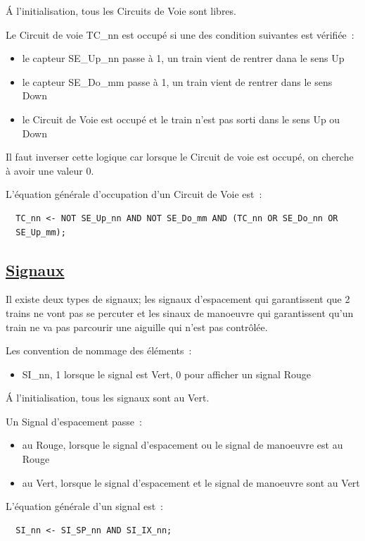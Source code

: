 \'A l'initialisation, tous les Circuits de Voie sont libres.

\medskip
Le Circuit de voie TC\_nn est occupé si une des condition suivantes
est vérifiée~:
\begin{itemize}
\item le capteur SE\_Up\_nn passe à 1, un train vient de rentrer dana
  le sens Up
\item le capteur SE\_Do\_mm passe à 1, un train vient de rentrer dans
  le sens Down
\item le Circuit de Voie est occupé et le train n'est pas sorti dans
  le sens Up ou Down
\end{itemize}

Il faut inverser cette logique car lorsque le Circuit de voie est
occupé, on cherche à avoir une valeur 0.

\medskip
L'équation générale d'occupation d'un Circuit de Voie est~:
\begin{lstlisting}
  TC_nn <- NOT SE_Up_nn AND NOT SE_Do_mm AND (TC_nn OR SE_Do_nn OR
  SE_Up_mm);
\end{lstlisting}


\subsection{\underline{Signaux}}
\label{sec:esp}

Il existe deux types de signaux; les signaux d'espacement qui
garantissent que 2 trains ne vont pas se percuter et les sinaux de
manoeuvre qui garantissent qu'un train ne va pas parcourir une
aiguille qui n'est pas contrôlée.

Les convention de nommage des éléments~:
\begin{itemize}
\item SI\_nn, 1 lorsque le signal est Vert, 0 pour afficher un signal
  Rouge
\end{itemize}

\'A l'initialisation, tous les signaux sont au Vert.

Un Signal d'espacement passe~:
\begin{itemize}
\item au Rouge, lorsque le signal d'espacement ou le signal de
  manoeuvre est au Rouge
\item au Vert, lorsque le signal d'espacement et le signal de
  manoeuvre sont au Vert
\end{itemize}


\medskip
L'équation générale d'un signal est~:
\begin{lstlisting}
  SI_nn <- SI_SP_nn AND SI_IX_nn;
\end{lstlisting}


